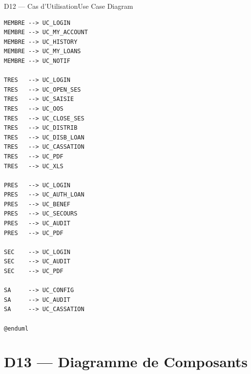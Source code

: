 \documentclass[12pt, a4paper]{report}
\begin{document}
\begin{diagramBox}{D12 — Cas d'Utilisation}{Use Case Diagram}
\begin{lstlisting}
MEMBRE --> UC_LOGIN
MEMBRE --> UC_MY_ACCOUNT
MEMBRE --> UC_HISTORY
MEMBRE --> UC_MY_LOANS
MEMBRE --> UC_NOTIF

TRES   --> UC_LOGIN
TRES   --> UC_OPEN_SES
TRES   --> UC_SAISIE
TRES   --> UC_OOS
TRES   --> UC_CLOSE_SES
TRES   --> UC_DISTRIB
TRES   --> UC_DISB_LOAN
TRES   --> UC_CASSATION
TRES   --> UC_PDF
TRES   --> UC_XLS

PRES   --> UC_LOGIN
PRES   --> UC_AUTH_LOAN
PRES   --> UC_BENEF
PRES   --> UC_SECOURS
PRES   --> UC_AUDIT
PRES   --> UC_PDF

SEC    --> UC_LOGIN
SEC    --> UC_AUDIT
SEC    --> UC_PDF

SA     --> UC_CONFIG
SA     --> UC_AUDIT
SA     --> UC_CASSATION

@enduml
\end{lstlisting}
\end{diagramBox}

\section{D13 — Diagramme de Composants}
\end{document}

